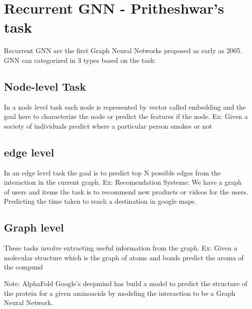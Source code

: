 \section{Recurrent GNN - Pritheshwar's task}
Recurrent GNN are the first Graph Neural Networks proposed as early as 2005. 
GNN can categorized in 3 types based on the task:
\subsection{Node-level Task}
In a node level task each node is represented by vector called embedding and the goal here to characterize the node or predict the features if the node. 
Ex: Given a society of individuals predict where a particular person smokes or not 
\subsection{edge level}
In an edge level task the goal is to predict top N possible edges from the interaction in the current graph.
Ex: Recomendation Systems: We have a graph of users and items the task is to recommend new products or videos for the users.
Predicting the time taken to reach a destination in google maps.

\subsection{Graph level}
These tasks involve extracting useful information from the graph.
Ex: Given a molecular structure which is the graph of atoms and bonds predict the aroma of the compund 

Note: AlphaFold 
Google's deepmind has build a model to predict the structure of the protein for a given aminoacids by modeling the interaction to be a Graph Neural Network.